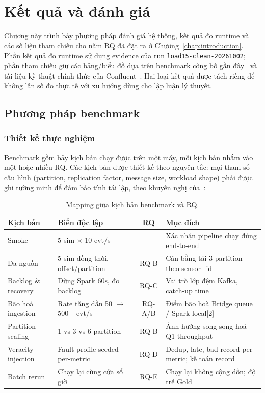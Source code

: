 \chapter{Kết quả và đánh giá}
\label{chap:results}

Chương này trình bày phương pháp đánh giá hệ thống, kết quả đo runtime
và các số liệu tham chiếu cho năm RQ đã đặt ra ở Chương~\ref{chap:introduction}.
Phần kết quả đo runtime sử dụng evidence của run
\texttt{load15-clean-20261002}; phần tham chiếu giữ các bảng/biểu đồ dựa
trên benchmark công bố gần đây~\cite{kafka_patterns_benchmark_2025,
shufflebench_2024, fault_recovery_stream_2024} và tài liệu kỹ thuật chính
thức của Confluent~\cite{confluent_partition_count,
confluent_optimize_clients}. Hai loại kết quả được tách riêng để không
lẫn số đo thực tế với xu hướng dùng cho lập luận lý thuyết.

\section{Phương pháp benchmark}

\subsection{Thiết kế thực nghiệm}

Benchmark gồm bảy kịch bản chạy được trên một máy, mỗi kịch bản nhắm vào
một hoặc nhiều RQ. Các kịch bản được thiết kế theo nguyên tắc: mọi tham
số cấu hình (partition, replication factor, message size, workload shape)
phải được ghi tường minh để đảm bảo tính tái lập, theo khuyến nghị
của~\cite{kafka_patterns_benchmark_2025}:

\begin{table}[H]
\centering
\caption{Mapping giữa kịch bản benchmark và RQ.}
\label{tab:benchmark-rq}
\small
\begin{tabularx}{\textwidth}{l l c X}
\toprule
\textbf{Kịch bản} & \textbf{Biến độc lập} & \textbf{RQ} & \textbf{Mục đích} \\
\midrule
Smoke & 5 sim $\times$ 10 evt/s & --- & Xác nhận pipeline chạy đúng end-to-end \\
Đa nguồn & 5 sim đồng thời, offset/partition & RQ-B & Cân bằng tải 3 partition theo sensor\_id \\
Backlog \& recovery & Dừng Spark 60s, đo backlog & RQ-C & Vai trò lớp đệm Kafka, catch-up time \\
Bão hoà ingestion & Rate tăng dần 50 $\rightarrow$ 500+ evt/s & RQ-A/B & Điểm bão hoà Bridge queue / Spark local{[}2{]} \\
Partition scaling & 1 vs 3 vs 6 partition & RQ-B & Ảnh hưởng song song hoá Q1 throughput \\
Veracity injection & Fault profile seeded per-metric & RQ-D & Dedup, late, bad record per-metric; kế toán record \\
Batch rerun & Chạy lại cùng cửa sổ giờ & RQ-E & Chạy lại không cộng dồn; độ trễ Gold \\
\bottomrule
\end{tabularx}
\end{table}

